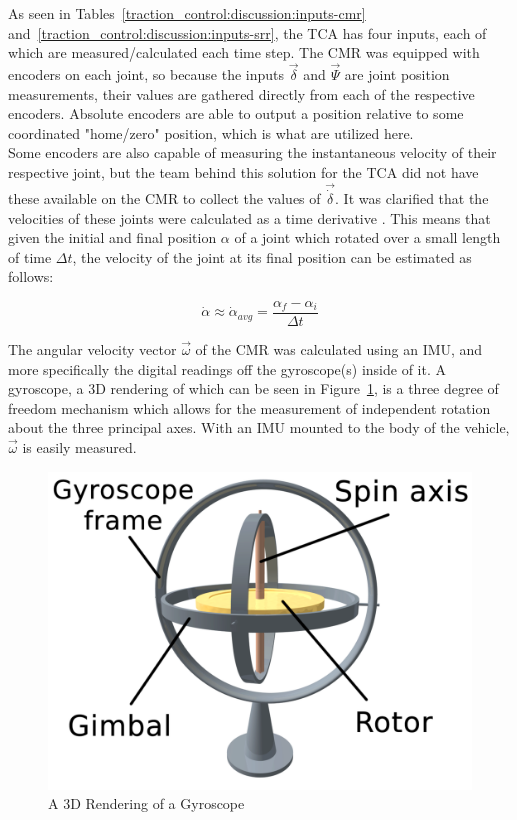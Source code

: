 As seen in Tables~\ref{traction_control:discussion:inputs-cmr} and~\ref{traction_control:discussion:inputs-srr}, the \ac{TCA} has four inputs, each of which are measured/calculated each time step. The \ac{CMR} was equipped with encoders on each joint, so because the inputs $\vec{\delta}$ and $\vec{\Psi}$ are joint position measurements, their values are gathered directly from each of the respective encoders. Absolute encoders are able to output a position relative to some coordinated "home/zero" position, which is what are utilized here. \\

Some encoders are also capable of measuring the instantaneous velocity of their respective joint, but the team behind this solution for the \ac{TCA} did not have these available on the \ac{CMR} to collect the values of $\vec{\dot{\delta}}$. It was clarified that the velocities of these joints were calculated as a time derivative \cite{tractl}. This means that given the initial and final position $\alpha$ of a joint which rotated over a small length of time $\Delta t$, the velocity of the joint at its final position can be estimated as follows:

\begin{equation}
\dot{\alpha} \approx \dot{\alpha}_{avg} = \frac{\alpha_{f} - \alpha_{i}}{\Delta t}
\end{equation}

The angular velocity vector $\vec{\omega}$ of the \ac{CMR} was calculated using an \ac{IMU}, and more specifically the digital readings off the gyroscope(s) inside of it. A gyroscope, a 3D rendering of which can be seen in Figure~\ref{traction_control:discussion:gyro}, is a three degree of freedom mechanism which allows for the measurement of independent rotation about the three principal axes. With an \ac{IMU} mounted to the body of the vehicle, $\vec{\omega}$ is easily measured.

\begin{figure}[H]
	\centering
	\includegraphics[width=.5\textwidth]{sections/discussion/images/gyroscope.png}
	\caption{A 3D Rendering of a Gyroscope}
	\label{traction_control:discussion:gyro}
\end{figure}

